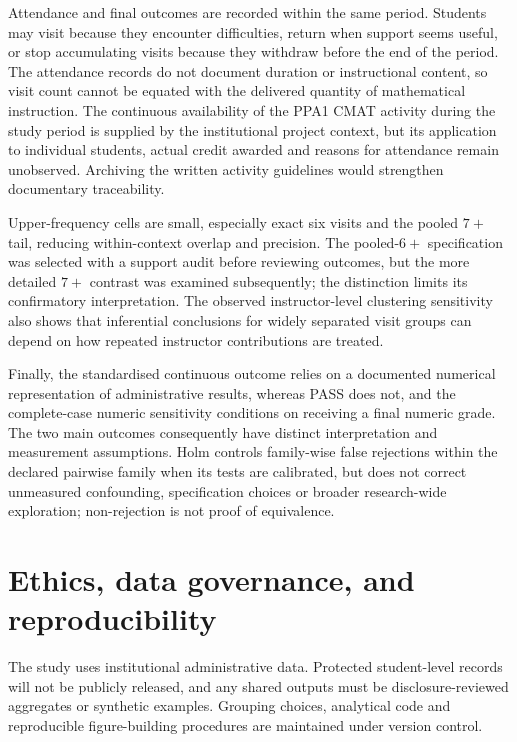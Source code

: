 Attendance and final outcomes are recorded within the same period. Students may visit because they encounter difficulties, return when support seems useful, or stop accumulating visits because they withdraw before the end of the period. The attendance records do not document duration or instructional content, so visit count cannot be equated with the delivered quantity of mathematical instruction. The continuous availability of the PPA1 CMAT activity during the study period is supplied by the institutional project context, but its application to individual students, actual credit awarded and reasons for attendance remain unobserved. Archiving the written activity guidelines would strengthen documentary traceability.

Upper-frequency cells are small, especially exact six visits and the pooled $7+$ tail, reducing within-context overlap and precision. The pooled-$6+$ specification was selected with a support audit before reviewing outcomes, but the more detailed $7+$ contrast was examined subsequently; the distinction limits its confirmatory interpretation. The observed instructor-level clustering sensitivity also shows that inferential conclusions for widely separated visit groups can depend on how repeated instructor contributions are treated.

Finally, the standardised continuous outcome relies on a documented numerical representation of administrative results, whereas PASS does not, and the complete-case numeric sensitivity conditions on receiving a final numeric grade. The two main outcomes consequently have distinct interpretation and measurement assumptions. Holm controls family-wise false rejections within the declared pairwise family when its tests are calibrated, but does not correct unmeasured confounding, specification choices or broader research-wide exploration; non-rejection is not proof of equivalence.

\section{Ethics, data governance, and reproducibility}

The study uses institutional administrative data. Protected student-level records will not be publicly released, and any shared outputs must be disclosure-reviewed aggregates or synthetic examples. Grouping choices, analytical code and reproducible figure-building procedures are maintained under version control.


